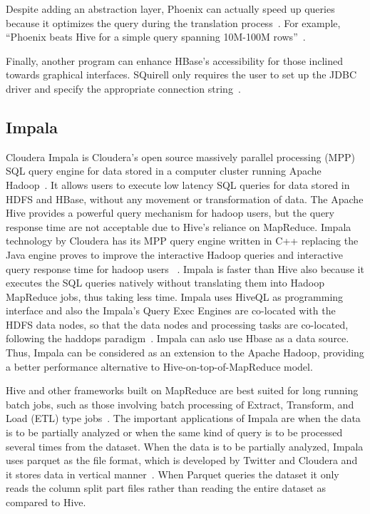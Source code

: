Despite adding an abstraction layer, Phoenix can actually speed up
queries because it optimizes the query during the translation
process~\cite{www-phoenix-cloudera}. For example, ``Phoenix beats Hive
for a simple query spanning 10M-100M rows''~\cite{www-phoenix-infoq}.

Finally, another program can enhance HBase's accessibility for those
inclined towards graphical interfaces.  SQuirell only requires the
user to set up the JDBC driver and specify the appropriate connection
string~\cite{www-phoenix-bighadoop}.

     \pv

\subsection{Impala}

Cloudera Impala is Cloudera's open source massively parallel
processing (MPP) SQL query engine for data stored in a computer
cluster running Apache Hadoop~\cite{www-impala-cloudera}. It allows
users to execute low latency SQL queries for data stored in HDFS and
HBase, without any movement or transformation of data. The Apache Hive
provides a powerful query mechanism for hadoop users, but the query
response time are not acceptable due to Hive's reliance on
MapReduce. Impala technology by Cloudera has its MPP query engine
written in C++ replacing the Java engine proves to improve the
interactive Hadoop queries and interactive query response time for
hadoop users~\cite{www-impala-dummies} . Impala is faster than Hive
also because it executes the SQL queries natively without translating
them into Hadoop MapReduce jobs, thus taking less time. Impala uses
HiveQL as programming interface and also the Impala's Query Exec
Engines are co-located with the HDFS data nodes, so that the data
nodes and processing tasks are co-located, following the haddops
paradigm~\cite{www-impala-dummies}.  Impala can aslo use Hbase as a
data source. Thus, Impala can be considered as an extension to the
Apache Hadoop, providing a better performance alternative to
Hive-on-top-of-MapReduce model.

Hive and other frameworks built on MapReduce are best suited for long
running batch jobs, such as those involving batch processing of
Extract, Transform, and Load (ETL) type
jobs~\cite{www-impala-cloudera}.  The important applications of Impala
are when the data is to be partially analyzed or when the same kind of
query is to be processed several times from the dataset. When the data
is to be partially analyzed, Impala uses parquet as the file format,
which is developed by Twitter and Cloudera and it stores data in
vertical manner~\cite{www-impala-beginner}. When Parquet queries the
dataset it only reads the column split part files rather than reading
the entire dataset as compared to Hive.
     
